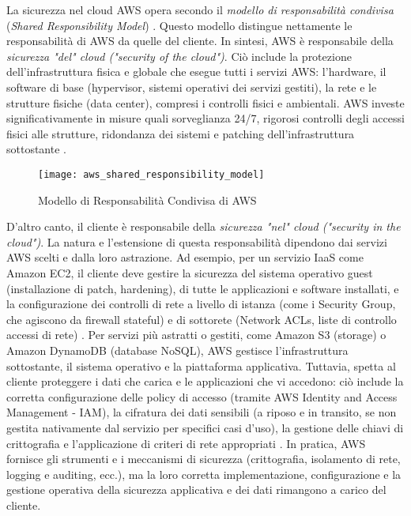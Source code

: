 La sicurezza nel cloud AWS opera secondo il \textit{modello di responsabilità condivisa} (\textit{Shared Responsibility Model}) \cite{aws-shared-responsibility}. Questo modello distingue nettamente le responsabilità di AWS da quelle del cliente. In sintesi, AWS è responsabile della \textit{sicurezza "del" cloud ("security of the cloud")}. Ciò include la protezione dell'infrastruttura fisica e globale che esegue tutti i servizi AWS: l'hardware, il software di base (hypervisor, sistemi operativi dei servizi gestiti), la rete e le strutture fisiche (data center), compresi i controlli fisici e ambientali. AWS investe significativamente in misure quali sorveglianza 24/7, rigorosi controlli degli accessi fisici alle strutture, ridondanza dei sistemi e patching dell'infrastruttura sottostante \cite{aws-shared-responsibility}.

\begin{figure}[htbp]
    \centering
    \texttt{[image: aws\_shared\_responsibility\_model]}
    \caption{Modello di Responsabilità Condivisa di AWS}
    \label{fig:shared_responsibility}
\end{figure}

D'altro canto, il cliente è responsabile della \textit{sicurezza "nel" cloud ("security in the cloud")}. La natura e l'estensione di questa responsabilità dipendono dai servizi AWS scelti e dalla loro astrazione. Ad esempio, per un servizio IaaS come Amazon EC2, il cliente deve gestire la sicurezza del sistema operativo guest (installazione di patch, hardening), di tutte le applicazioni e software installati, e la configurazione dei controlli di rete a livello di istanza (come i Security Group, che agiscono da firewall stateful) e di sottorete (Network ACLs, liste di controllo accessi di rete) \cite{aws-shared-responsibility}. Per servizi più astratti o gestiti, come Amazon S3 (storage) o Amazon DynamoDB (database NoSQL), AWS gestisce l'infrastruttura sottostante, il sistema operativo e la piattaforma applicativa. Tuttavia, spetta al cliente proteggere i dati che carica e le applicazioni che vi accedono: ciò include la corretta configurazione delle policy di accesso (tramite AWS Identity and Access Management - IAM), la cifratura dei dati sensibili (a riposo e in transito, se non gestita nativamente dal servizio per specifici casi d'uso), la gestione delle chiavi di crittografia e l'applicazione di criteri di rete appropriati \cite{aws-shared-responsibility}. In pratica, AWS fornisce gli strumenti e i meccanismi di sicurezza (crittografia, isolamento di rete, logging e auditing, ecc.), ma la loro corretta implementazione, configurazione e la gestione operativa della sicurezza applicativa e dei dati rimangono a carico del cliente.

